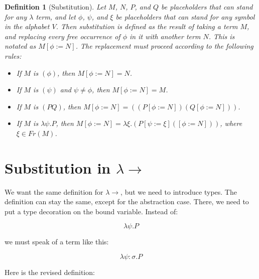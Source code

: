 \documentclass{book}
\numberwithin{equation}{chapter}
\newtheorem*{anon-definition}{Definition}
\begin{document}
\begin{anon-definition}[Substitution]
Let $M$, $N$, $P$, and $Q$ be placeholders that can stand for any $\lambda$ term, and let $\phi$, $\psi$, and $\xi$ be placeholders that can stand for any symbol in the alphabet $V$. Then substitution is defined as the result of taking a term $M$, and replacing every free occurrence of $\phi$ in it with another term $N$. This is notated as $M[\phi := N]$. The replacement must proceed according to the following rules:

\begin{itemize}
\item{If $M$ is $(\phi)$, then $M[\phi := N] = N$.}
\item{If $M$ is $(\psi)$ and $\psi \not = \phi$, then $M[\phi := N] = M$.}
\item{If $M$ is $(PQ)$, then $M[\phi := N] = ((P[\phi := N])(Q[\phi := N]))$.}
\item{If $M$ is $\lambda \psi.P$, then $M[\phi := N] = \lambda \xi.(P[\psi := \xi]([\phi := N]))$, where $\xi \in Fr(M)$.}
\end{itemize}
\end{anon-definition}


\section{Substitution in $\lambda\rightarrow$}

We want the same definition for $\lambda\rightarrow$, but we need to introduce types. The definition can stay the same, except for the abstraction case. There, we need to put a type decoration on the bound variable. Instead of:

\begin{equation*}
\lambda \psi.P
\end{equation*}

\noindent
we must speak of a term like this:

\begin{equation*}
\lambda \psi : \sigma.P
\end{equation*}

\noindent
Here is the revised definition:
\end{document}
